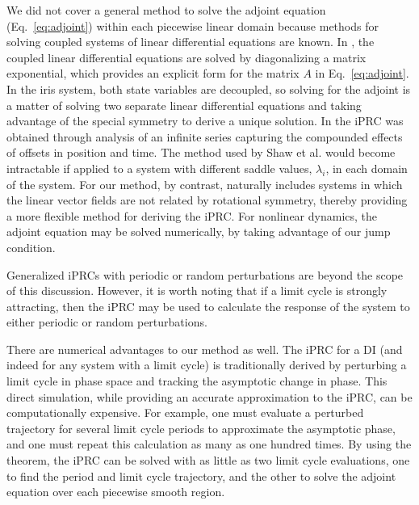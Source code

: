 \documentclass[12pt]{article}
\begin{document}
We did not cover a general method to solve the adjoint equation (Eq.~\ref{eq:adjoint}) within each piecewise linear domain because methods for solving coupled systems of linear differential equations are known.  In \cite{Coombes:2008:SIADS}, the coupled linear differential equations are solved by diagonalizing a matrix exponential, which provides an explicit form for the matrix $A$ in Eq.~\eqref{eq:adjoint}.  In the iris system, both state variables are decoupled, so solving for the adjoint is a matter of solving two separate linear differential equations and taking advantage of the special symmetry to derive a unique solution.  In \cite{ShawParkChielThomas2012SIADS} the iPRC was obtained through analysis of an infinite series capturing the compounded effects of offsets in position and time.  The method used by Shaw et al. would become intractable if applied to a system with different saddle values, $\lambda_i$, in each domain of the system.  For our method, by contrast, naturally includes systems in which 
the linear vector fields are not related by rotational symmetry, thereby providing a more flexible method for deriving the iPRC. For nonlinear dynamics, the adjoint equation may be solved numerically, by taking advantage of our jump condition.

Generalized iPRCs with periodic or random perturbations are beyond the scope of this discussion.  However, it is worth noting that if a limit cycle is strongly attracting, then the iPRC may be used to calculate the response of the system to either periodic or random perturbations.


There are numerical advantages to our method as well.  The iPRC for a DI (and indeed for any system with a limit cycle) is traditionally derived by perturbing a limit cycle in phase space and tracking the asymptotic change in phase.  This direct simulation, while providing an accurate approximation to the iPRC, can be computationally expensive.  For example, one must evaluate a perturbed trajectory for several limit cycle periods to approximate the asymptotic phase, and one must repeat this calculation as many as one hundred times.  By using the theorem, the iPRC can be solved with as little as two limit cycle evaluations, one to find the period and limit cycle trajectory, and the other to solve the adjoint equation over each piecewise smooth region.
\end{document}

